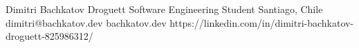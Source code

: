 \documentclass[10pt,a4paper]{article}
\begin{document}
\raggedbottom


\ResumeHeader
    {Dimitri Bachkatov Droguett}
    {Software Engineering Student}
    {Santiago, Chile}
    {dimitri@bachkatov.dev}
    {bachkatov.dev}
    {https://linkedin.com/in/dimitri-bachkatov-droguett-825986312/}


\noindent
\begin{minipage}[t]{0.29\textwidth}

    \ResumeSidebar{

        

        

        

        

    }

\end{minipage}
\hfill
\begin{minipage}[t]{0.68\textwidth}

    

    

\end{minipage}


\end{document}
